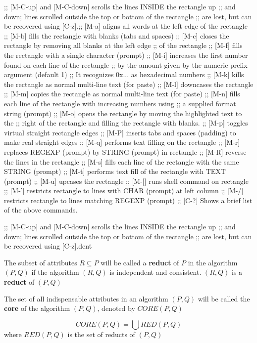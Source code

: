 \documentclass[11pt]{article}
\begin{document}
{;; [M-C-up] and [M-C-down] scrolls the lines INSIDE the rectangle up
;; and down; lines scrolled outside the top or bottom of the rectangle
;; are lost, but can be recovered using [C-z].;; [M-a] aligns all words at the left edge of the rectangle
;; [M-b] fills the rectangle with blanks (tabs and spaces)
;; [M-c] closes the rectangle by removing all blanks at the left edge
;;       of the rectangle
;; [M-f] fills the rectangle with a single character (prompt)
;; [M-i] increases the first number found on each line of the rectangle
;;       by the amount given by the numeric prefix argument (default 1)
;;       It recognizes 0x... as hexadecimal numbers
;; [M-k] kills the rectangle as normal multi-line text (for paste)
;; [M-l] downcases the rectangle
;; [M-m] copies the rectangle as normal multi-line text (for paste)
;; [M-n] fills each line of the rectangle with increasing numbers using
;;       a supplied format string (prompt)
;; [M-o] opens the rectangle by moving the highlighted text to the
;;       right of the rectangle and filling the rectangle with blanks.
;; [M-p] toggles virtual straight rectangle edges
;; [M-P] inserts tabs and spaces (padding) to make real straight edges
;; [M-q] performs text filling on the rectangle
;; [M-r] replaces REGEXP (prompt) by STRING (prompt) in rectangle
;; [M-R] reverse the lines in the rectangle
;; [M-s] fills each line of the rectangle with the same STRING (prompt)
;; [M-t] performs text fill of the rectangle with TEXT (prompt)
;; [M-u] upcases the rectangle
;; [M-|] runs shell command on rectangle
;; [M-'] restricts rectangle to lines with CHAR (prompt) at left column
;; [M-/] restricts rectangle to lines matching REGEXP (prompt)
;; [C-?] Shows a brief list of the above commands.

;; [M-C-up] and [M-C-down] scrolls the lines INSIDE the rectangle up
;; and down; lines scrolled outside the top or bottom of the rectangle
;; are lost, but can be recovered using [C-z].dent}

The subset of attributes \(R\subseteq P\) will be called a \textbf{reduct} of \(P\) in the
algorithm \((P,Q)\) if the algorithm \((R,Q)\) is independent and consistent.
\((R,Q)\) is a \textbf{reduct} of \((P,Q)\)

The set of all indispensable attributes in an algorithm \((P,Q)\) will be
called the \textbf{core} of the algorithm \((P,Q)\), denoted by \(CORE(P,Q)\)

\begin{proposition}[7.7]
\begin{equation*}
CORE(P,Q)=\bigcup RED(P,Q)
\end{equation*}
where \(RED(P,Q)\) is the set of reducts of \((P,Q)\)
\end{proposition}
\end{document}
